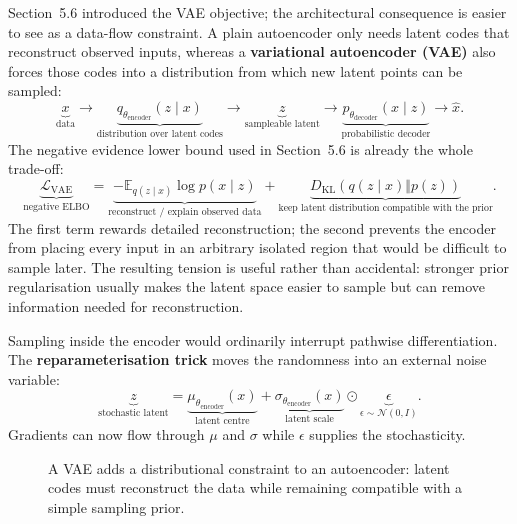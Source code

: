 Section~5.6 introduced the VAE objective; the architectural consequence is easier to see as a data-flow constraint.
A plain autoencoder only needs latent codes that reconstruct observed inputs, whereas a \textbf{variational autoencoder (VAE)} also forces those codes into a distribution from which new latent points can be sampled:
\[
\underbrace{x}_{\text{data}}
\rightarrow
\underbrace{q_{\theta_{\text{encoder}}}(z\mid x)}_{\text{distribution over latent codes}}
\rightarrow
\underbrace{z}_{\text{sampleable latent}}
\rightarrow
\underbrace{p_{\theta_{\text{decoder}}}(x\mid z)}_{\text{probabilistic decoder}}
\rightarrow
\hat x.
\]
The negative evidence lower bound used in Section~5.6 is already the whole trade-off:
\[
\underbrace{\mathcal L_{\text{VAE}}}_{\text{negative ELBO}}
=
\underbrace{-\mathbb E_{q(z\mid x)}\log p(x\mid z)}_{\text{reconstruct / explain observed data}}
+
\underbrace{D_{\mathrm{KL}}\!\left(q(z\mid x)\Vert p(z)\right)}_{\text{keep latent distribution compatible with the prior}}.
\]
The first term rewards detailed reconstruction; the second prevents the encoder from placing every input in an arbitrary isolated region that would be difficult to sample later.
The resulting tension is useful rather than accidental: stronger prior regularisation usually makes the latent space easier to sample but can remove information needed for reconstruction.

Sampling inside the encoder would ordinarily interrupt pathwise differentiation.
The \textbf{reparameterisation trick} moves the randomness into an external noise variable:
\[
\underbrace{z}_{\text{stochastic latent}}
=
\underbrace{\mu_{\theta_{\text{encoder}}}(x)}_{\text{latent centre}}
+
\underbrace{\sigma_{\theta_{\text{encoder}}}(x)}_{\text{latent scale}}
\odot
\underbrace{\epsilon}_{\epsilon\sim\mathcal N(0,I)}.
\]
Gradients can now flow through $\mu$ and $\sigma$ while $\epsilon$ supplies the stochasticity.

\begin{figure}[H]
\centering
{}
\caption{A VAE adds a distributional constraint to an autoencoder: latent codes must reconstruct the data while remaining compatible with a simple sampling prior.}
\label{fig:vae-flow}
\end{figure}

